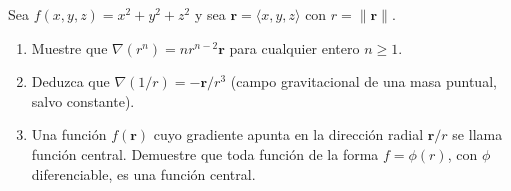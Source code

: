 Sea $f(x, y, z) = x^2 + y^2 + z^2$ y sea $\mathbf{r} = \langle x, y, z \rangle$ con $r = \|\mathbf{r}\|$.
\begin{enumerate}
    \item Muestre que $\nabla(r^n) = n r^{n-2} \mathbf{r}$ para cualquier entero $n \geq 1$.
    \item Deduzca que $\nabla(1/r) = -\mathbf{r}/r^3$ (campo gravitacional de una masa puntual, salvo constante).
    \item Una función $f(\mathbf{r})$ cuyo gradiente apunta en la dirección radial $\mathbf{r}/r$ se llama función central. Demuestre que toda función de la forma $f = \phi(r)$, con $\phi$ diferenciable, es una función central.
\end{enumerate}
